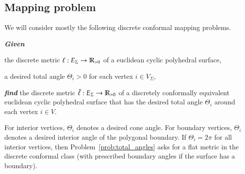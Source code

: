 \documentclass[Thesis.tex]{subfiles}
\begin{document}

  \subsection{Mapping problem}
  \label{sec:mapping_problem}

  We will consider mostly the following discrete conformal mapping problems.
  \begin{problem}
  \label{prob:total_angles}
    \textbf{\itshape{Given}}

    \begin{compactitem}
    \item the discrete metric $\ell:E_{\Sigma}\rightarrow\mathbb R_{>0}$ of a
      euclidean cyclic polyhedral surface,
    \item a desired total angle $\Theta_{i}>0$ for each vertex
      $i\in V_{\Sigma}$,
    \end{compactitem}

    \smallskip\noindent%
    \textbf{\itshape{find}} the discrete metric
    $\tilde\ell:E_{\Sigma}\rightarrow\mathbb R_{>0}$ of a discretely
    conformally equivalent euclidean cyclic polyhedral surface that has
    the desired total angle $\Theta_{i}$ around each vertex $i\in
    V$.
  \end{problem}

  For interior vertices, $\Theta_i$ denotes a desired cone angle. For
  boundary vertices, $\Theta_i$ denotes a desired interior angle of the
  polygonal boundary. If $\Theta_{i}=2\pi$ for all interior vertices,
  then Problem~\ref{prob:total_angles} asks for a flat metric in the
  discrete conformal class (with prescribed boundary angles if the
  surface has a boundary).
\end{document}

